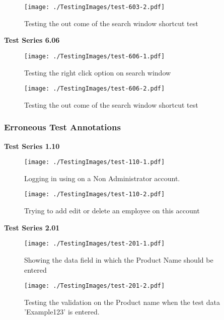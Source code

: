 \begin{figure}[H]
    \texttt{[image: ./TestingImages/test-603-2.pdf]}
    \caption{Testing the out come of the search window shortcut test} \label{fig:test-603-2}
\end{figure}

\textbf{Test Series 6.06}

\begin{figure}[H]
    \texttt{[image: ./TestingImages/test-606-1.pdf]}
    \caption{Testing the right click option on search window} \label{fig:test-606-1}
\end{figure}

\begin{figure}[H]
    \texttt{[image: ./TestingImages/test-606-2.pdf]}
    \caption{Testing the out come of the search window shortcut test} \label{fig:test-606-2}
\end{figure}


\subsubsection{Erroneous Test Annotations}

\textbf{Test Series 1.10}

\begin{figure}[H]
    \texttt{[image: ./TestingImages/test-110-1.pdf]}
    \caption{Logging in using on a Non Administrator account.}  \label{fig:test-110-1}
\end{figure}

\begin{figure}[H]
    \texttt{[image: ./TestingImages/test-110-2.pdf]}
    \caption{Trying to add edit or delete an employee on this account}  \label{fig:test-110-2}
\end{figure}

\textbf{Test Series 2.01}

\begin{figure}[H]
    \texttt{[image: ./TestingImages/test-201-1.pdf]}
    \caption{Showing the data field in which the Product Name should be entered}  \label{fig:test-201-1}
\end{figure}

\begin{figure}[H]
    \texttt{[image: ./TestingImages/test-201-2.pdf]}
    \caption{Testing the validation on the Product name when the test data 'Example123' is entered.}  \label{fig:test-201-2}
\end{figure}

